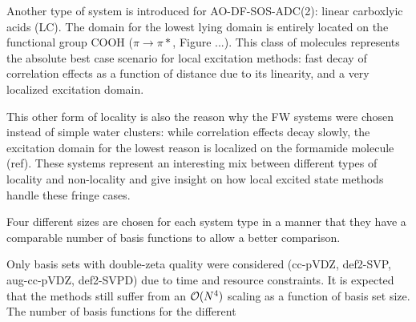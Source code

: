 Another type of system is introduced for AO-DF-SOS-ADC(2): linear carboxlyic acids (LC). The domain for the lowest lying domain is entirely located on the functional group COOH ($\pi\rightarrow\pi*$, Figure ...). This class of molecules represents the absolute best case scenario for local excitation methods: fast decay of correlation effects as a function of distance due to its linearity, and a very localized excitation domain. 

This other form of locality is also the reason why the FW systems were chosen instead of simple water clusters: while correlation effects decay slowly, the excitation domain for the lowest reason is localized on the formamide molecule (ref). These systems represent an interesting mix between different types of locality and non-locality and give insight on how local excited state methods handle these fringe cases. 

Four different sizes are chosen for each system type in a manner that they have a comparable number of basis functions to allow a better comparison.

Only basis sets with double-zeta quality were considered (cc-pVDZ, def2-SVP, aug-cc-pVDZ, def2-SVPD) due to time and resource constraints. It is expected that the methods still suffer from an $\mathcal{O}(N^{4})$ scaling as a function of basis set size. The number of basis functions for the different

